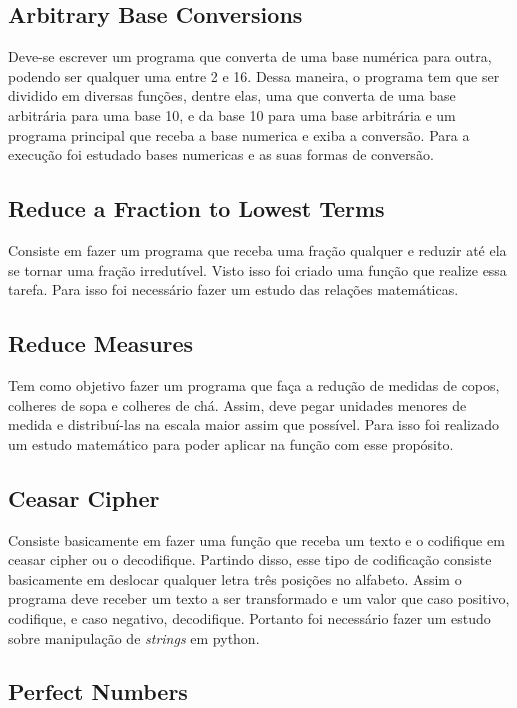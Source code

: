 \subsection{Arbitrary Base Conversions}

Deve-se escrever um programa que converta de uma base numérica para outra, podendo ser qualquer uma entre 2 e 16. Dessa maneira, o programa tem que ser dividido em diversas funções, dentre elas, uma que converta de uma base arbitrária para uma base 10, e da base 10 para uma base arbitrária e um programa principal que receba a base numerica e exiba a conversão. Para a execução foi estudado bases numericas e as suas formas de conversão. 

\subsection{Reduce a Fraction to Lowest Terms}

Consiste em fazer um programa que receba uma fração qualquer e reduzir até ela se tornar uma fração irredutível. Visto isso foi criado uma função que realize essa tarefa. Para isso foi necessário fazer um estudo das relações matemáticas.

\subsection{Reduce Measures}

Tem como objetivo fazer um programa que faça a redução de medidas de copos, colheres de sopa e colheres de chá. Assim, deve pegar unidades menores de medida e distribuí-las na escala maior assim que possível. Para isso foi realizado um estudo matemático para poder aplicar na função com esse propósito. 

\subsection{Ceasar Cipher}

Consiste basicamente em fazer uma função que receba um texto e o codifique em ceasar cipher ou o decodifique. Partindo disso, esse tipo de codificação consiste basicamente em deslocar qualquer letra três posições no alfabeto. Assim o programa deve receber um texto a ser transformado e um valor que caso positivo, codifique, e caso negativo, decodifique. Portanto foi necessário fazer um estudo sobre manipulação de \textit{strings} em python.

\subsection{Perfect Numbers}

